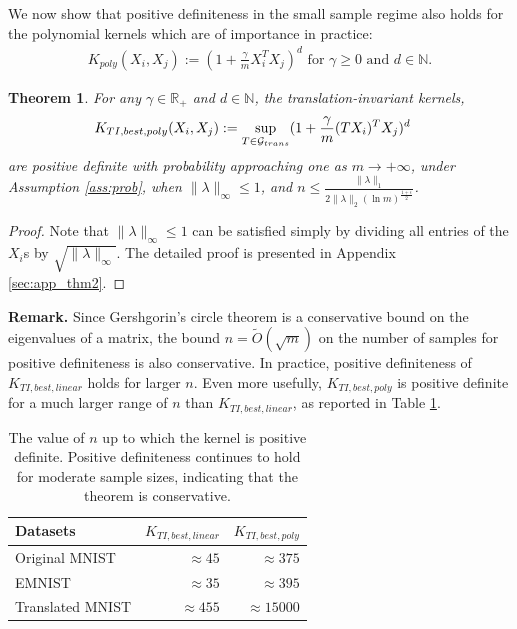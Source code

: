 \documentclass{article}
\theoremstyle{plain}
\newtheorem{theorem}{Theorem}
\theoremstyle{definition}
\theoremstyle{remark}
\begin{document}
We now show that positive definiteness in the small sample regime also holds for the polynomial kernels which are of importance in practice:
\begin{align*}
    K_{poly}(X_i,X_j) := (1+ \frac{\gamma}{m} X_i^T X_j)^d \mbox{ for }\gamma \geq 0 \mbox{ and } d \in \mathbb{N}.
\end{align*}
 
\begin{theorem}  \label{thm2}
    For any $\gamma \in \mathbb{R}_+$ and $ d \in \mathbb{N}$,
    the translation-invariant kernels,
    \begin{align}
    K_{TI,best,poly}(X_i,X_j) &:= \sup_{T \in {\cal{G}}_{trans}}(1 + \frac{\gamma}{m}   (TX_i)^TX_j)^d
    \end{align}
    are positive definite with probability approaching one as $m \to +\infty$, under Assumption \ref{ass:prob}, when $\|\lambda\|_{\infty} \leq 1$, and $n \leq \frac{\|\lambda\|_1}{2\|\lambda\|_2 (\ln m)^{\frac{1+\epsilon}{2}}}$.
\end{theorem}

\begin{proof}
Note that $\|\lambda\|_{\infty} \leq 1$ can be satisfied simply by dividing all entries of the $X_i$s by $\sqrt{\|\lambda\|_{\infty}}$. The detailed proof is presented in Appendix \ref{sec:app_thm2}.
\end{proof}
 
\noindent \textbf{Remark.} Since Gershgorin's circle theorem is a conservative bound on the eigenvalues of a matrix, the bound $n = \tilde{O}(\sqrt{m})$ on the number of samples for positive definiteness is also conservative. In practice, positive definiteness of $K_{TI,best,linear}$ holds for larger $n$. Even more usefully, $K_{TI,best,poly}$ is positive definite for a much larger range of $n$ than $K_{TI,best,linear}$, as reported in Table \ref{tab:pd}.

\begin{table}
\caption{The value of $n$ up to which the kernel is positive definite. Positive definiteness continues to hold for moderate sample sizes, indicating that the theorem is conservative.}
\vskip 0.1in
\centering
\begin{tabular}{lrr}
\toprule
Datasets & $K_{TI, best, linear}$ & $K_{TI, best, poly}$\\
\midrule
Original MNIST & $\approx 45$ & $\approx 375$\\
EMNIST & $\approx 35$ & $\approx 395$\\
Translated MNIST & $\approx 455$ & $\approx 15000$\\
\bottomrule
\end{tabular}
\label{tab:pd}
\end{table}
\end{document}
